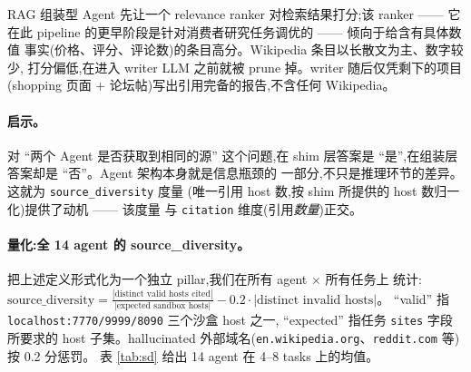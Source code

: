 \documentclass[UTF8,11pt]{ctexart}
\begin{document}
RAG 组装型 Agent 先让一个 relevance ranker 对检索结果打分;该 ranker —— 它
在此 pipeline 的更早阶段是针对消费者研究任务调优的 —— 倾向于给含有具体数值
事实(价格、评分、评论数)的条目高分。Wikipedia 条目以长散文为主、数字较少,
打分偏低,在进入 writer LLM 之前就被 prune 掉。writer 随后仅凭剩下的项目
(shopping 页面 + 论坛帖)写出引用完备的报告,不含任何 Wikipedia。

\paragraph{启示。}
对 “两个 Agent 是否获取到相同的源” 这个问题,在 shim 层答案是
“是”,在组装层答案却是 “否”。Agent 架构本身就是信息瓶颈的
一部分,不只是推理环节的差异。这就为 \texttt{source\_diversity} 度量
(唯一引用 host 数,按 shim 所提供的 host 数归一化)提供了动机 —— 该度量
与 \texttt{citation} 维度(引用\emph{数量})正交。

\paragraph{量化:全 14 agent 的 source\_diversity。}
把上述定义形式化为一个独立 pillar,我们在所有 agent $\times$ 所有任务上
统计:$\mathrm{source\_diversity} =
\frac{|\text{distinct valid hosts cited}|}{|\text{expected sandbox hosts}|}
- 0.2 \cdot |\text{distinct invalid hosts}|$。
``valid'' 指 \texttt{localhost:7770/9999/8090} 三个沙盒 host 之一,
``expected'' 指任务 \texttt{sites} 字段所要求的 host 子集。hallucinated
外部域名(\texttt{en.wikipedia.org}、\texttt{reddit.com} 等)按 0.2 分惩罚。
表 \ref{tab:sd} 给出 14 agent 在 4--8 tasks 上的均值。
\end{document}
